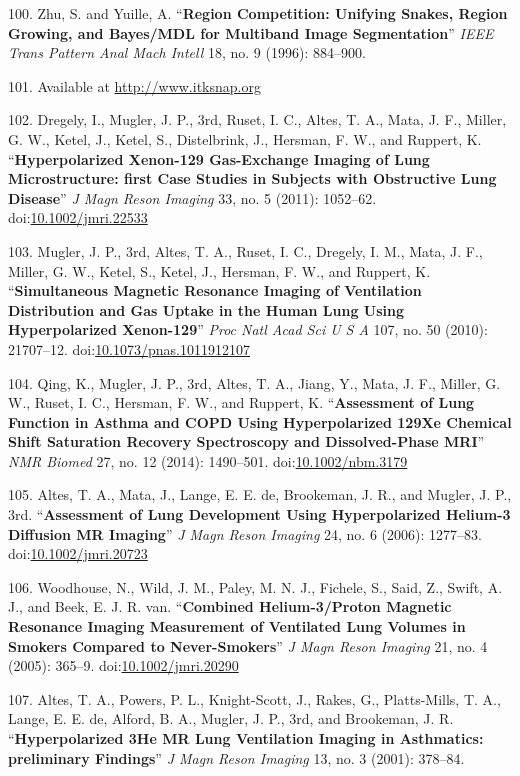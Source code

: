 \documentclass[11pt,]{article}
\begin{document}
100. Zhu, S. and Yuille, A. ``\textbf{Region Competition: Unifying
Snakes, Region Growing, and Bayes/MDL for Multiband Image
Segmentation}'' \emph{IEEE Trans Pattern Anal Mach Intell} 18, no. 9
(1996): 884--900.

101. Available at \url{http://www.itksnap.org}

102. Dregely, I., Mugler, J. P., 3rd, Ruset, I. C., Altes, T. A., Mata,
J. F., Miller, G. W., Ketel, J., Ketel, S., Distelbrink, J., Hersman, F.
W., and Ruppert, K. ``\textbf{Hyperpolarized Xenon-129 Gas-Exchange
Imaging of Lung Microstructure: first Case Studies in Subjects with
Obstructive Lung Disease}'' \emph{J Magn Reson Imaging} 33, no. 5
(2011): 1052--62.
doi:\href{http://dx.doi.org/10.1002/jmri.22533}{10.1002/jmri.22533}

103. Mugler, J. P., 3rd, Altes, T. A., Ruset, I. C., Dregely, I. M.,
Mata, J. F., Miller, G. W., Ketel, S., Ketel, J., Hersman, F. W., and
Ruppert, K. ``\textbf{Simultaneous Magnetic Resonance Imaging of
Ventilation Distribution and Gas Uptake in the Human Lung Using
Hyperpolarized Xenon-129}'' \emph{Proc Natl Acad Sci U S A} 107, no. 50
(2010): 21707--12.
doi:\href{http://dx.doi.org/10.1073/pnas.1011912107}{10.1073/pnas.1011912107}

104. Qing, K., Mugler, J. P., 3rd, Altes, T. A., Jiang, Y., Mata, J. F.,
Miller, G. W., Ruset, I. C., Hersman, F. W., and Ruppert, K.
``\textbf{Assessment of Lung Function in Asthma and COPD Using
Hyperpolarized 129Xe Chemical Shift Saturation Recovery Spectroscopy and
Dissolved-Phase MRI}'' \emph{NMR Biomed} 27, no. 12 (2014): 1490--501.
doi:\href{http://dx.doi.org/10.1002/nbm.3179}{10.1002/nbm.3179}

105. Altes, T. A., Mata, J., Lange, E. E. de, Brookeman, J. R., and
Mugler, J. P., 3rd. ``\textbf{Assessment of Lung Development Using
Hyperpolarized Helium-3 Diffusion MR Imaging}'' \emph{J Magn Reson
Imaging} 24, no. 6 (2006): 1277--83.
doi:\href{http://dx.doi.org/10.1002/jmri.20723}{10.1002/jmri.20723}

106. Woodhouse, N., Wild, J. M., Paley, M. N. J., Fichele, S., Said, Z.,
Swift, A. J., and Beek, E. J. R. van. ``\textbf{Combined Helium-3/Proton
Magnetic Resonance Imaging Measurement of Ventilated Lung Volumes in
Smokers Compared to Never-Smokers}'' \emph{J Magn Reson Imaging} 21, no.
4 (2005): 365--9.
doi:\href{http://dx.doi.org/10.1002/jmri.20290}{10.1002/jmri.20290}

107. Altes, T. A., Powers, P. L., Knight-Scott, J., Rakes, G.,
Platts-Mills, T. A., Lange, E. E. de, Alford, B. A., Mugler, J. P., 3rd,
and Brookeman, J. R. ``\textbf{Hyperpolarized 3He MR Lung Ventilation
Imaging in Asthmatics: preliminary Findings}'' \emph{J Magn Reson
Imaging} 13, no. 3 (2001): 378--84.
\end{document}
